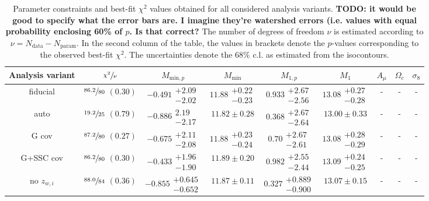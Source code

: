 \documentclass[a4paper,11pt]{article}
\newcommand{\todo}[1]{{\bf TODO: #1}}
\newcommand\Tstrut{\rule{0pt}{3ex}}
\begin{document}
      \begin{table}
        \caption{Parameter constraints and best-fit $\chi^{2}$ values obtained for all considered analysis variants. \todo{it would be good to specify what the error bars are. I imagine they're watershed errors (i.e. values with equal probability enclosing 60\% of $p$. Is that correct?} The number of degrees of freedom $\nu$ is estimated according to $\nu = N_{\mathrm{data}}-N_{\mathrm{param}}$. In the second column of the table, the values in brackets denote the $p$-values corresponding to the observed best-fit $\chi^{2}$. The uncertainties denote the $68 \%$ c.l. as estimated from the isocontours.} \label{tab:constraints_robustness}
        \begin{center}
          \begin{tabular}{ccccccccc}
            \hline\hline 
            Analysis variant & $\sfrac{\chi^{2}}{\nu}$ & $M_{\mathrm{min}, p}$ & $M_{\mathrm{min}}$ & $M_{1, p}$ & $M_{1}$ & $A_{\mu}$ & $\Omega_{c}$ & $\sigma_{8}$ \\ \hline \Tstrut       
            fiducial & $\sfrac{86.2}{80}$ $(0.30)$ & $-0.491\substack{+2.09 \\ -2.02}$ & $11.88\substack{+0.22 \\ -0.23}$ & $0.933\substack{+2.67 \\ -2.56}$ & $13.08\substack{+0.27 \\ -0.28}$ & - & - & - \\
            auto & $\sfrac{19.2}{25}$ $(0.79)$ & $-0.886\substack{2.19 \\ -2.17}$ & $11.82 \pm 0.28$ & $0.368\substack{+2.67 \\ -2.64}$ & $13.00 \pm 0.33$  & - & - & - \\
            G cov & $\sfrac{87.2}{80}$ $(0.27)$ & $-0.675\substack{+2.11 \\ -2.08}$ & $11.88\substack{+0.23 \\ -0.24}$ & $0.70\substack{+2.67 \\ -2.61}$ & $13.08\substack{+0.28 \\ -0.29}$ & - & - & - \\
            G+SSC cov & $\sfrac{86.2}{80}$ $(0.30)$ & $-0.433\substack{+1.96 \\ -1.90}$ & $11.89 \pm 0.20$ & $0.982\substack{+2.55 \\ -2.44}$ & $13.09\substack{+0.24 \\ -0.25}$ & - & - & - \\
            no $z_{w, i}$ & $\sfrac{88.0}{84}$ $(0.36)$ & $-0.855\substack{+0.645 \\ -0.652}$ & $11.87 \pm 0.11$ & $0.327\substack{+0.889 \\ -0.900}$ & $13.07 \pm 0.15$ & - & - & - \\

\end{tabular}
\end{center}
\end{table}
\end{document}
